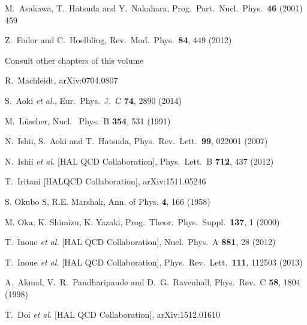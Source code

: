 \begin{thebibliography}{99.}
  M.~Asakawa, T.~Hatsuda and Y.~Nakahara,
  Prog.\ Part.\ Nucl.\ Phys.\  {\bf 46} (2001) 459

  
  Z.~Fodor and C.~Hoelbling, Rev.\ Mod.\ Phys.\  {\bf 84},  449 (2012)
   
Consult other chapters of this volume
 
  R.~Machleidt, arXiv:0704.0807

  S.~Aoki {\it et al.},
  Eur.\ Phys.\ J.\ C {\bf 74},  2890 (2014)

 M.~L\"{u}scher, Nucl. \ Phys.\ B {\bf 354},  531 (1991)

N.~Ishii, S.~Aoki and T.~Hatsuda,
Phys.\ Rev.\ Lett.\  {\bf 99},  022001 (2007)

  N.~Ishii {\it et al.} [HAL QCD Collaboration],
 Phys.\ Lett.\ B {\bf 712},  437 (2012)

T.~Iritani [HALQCD Collaboration], arXiv:1511.05246

S. Okubo S, R.E. Marshak, Ann. of Phys. {\bf 4},  166 (1958)

M. Oka, K. Shimizu, K. Yazaki, Prog.\ Theor.\ Phys.\ Suppl.\  {\bf 137},   1 (2000)

  T.~Inoue {\it et al.} [HAL QCD Collaboration],
  Nucl.\ Phys.\ A {\bf 881},  28 (2012)
  
  T.~Inoue {\it et al.} [HAL QCD Collaboration],
  Phys.\ Rev.\ Lett.\  {\bf 111},  112503 (2013)
  
  A.~Akmal, V.~R.~Pandharipande and D.~G.~Ravenhall,
  Phys.\ Rev.\ C {\bf 58}, 1804 (1998)
  
  T.~Doi {\it et al.} [HAL QCD Collaboration], arXiv:1512.01610
 


  
\end{thebibliography}
